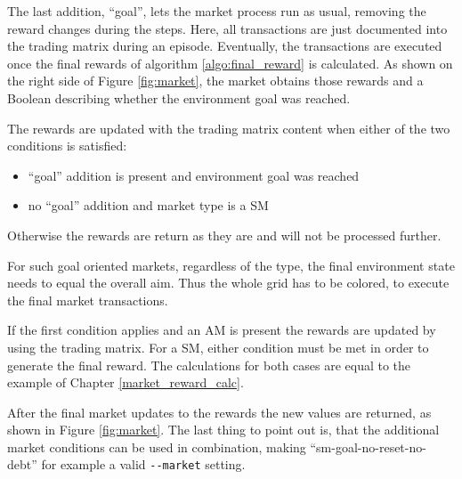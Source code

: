 The last addition, ``goal'', lets the market process run as usual, removing the reward changes during the steps. Here, all transactions are just documented into the trading matrix during an episode. Eventually, the transactions are executed once the final rewards of algorithm \ref{algo:final_reward} is calculated. As shown on the right side of Figure \ref{fig:market}, the market obtains those rewards and a Boolean describing whether the environment goal was reached.

The rewards are updated with the trading matrix content when either of the two conditions is satisfied:
\begin{itemize}
    \item ``goal'' addition is present and environment goal was reached
    \item no ``goal'' addition and market type is a SM
\end{itemize}
Otherwise the rewards are return as they are and will not be processed further. 

For such goal oriented markets, regardless of the type, the final environment state needs to equal the overall aim. Thus the whole grid has to be colored, to execute the final market transactions.


If the first condition applies and an AM is present the rewards are updated by using the trading matrix. For a SM, either condition must be met in order to generate the final reward. The calculations for both cases are equal to the example of Chapter \ref{market_reward_calc}.

After the final market updates to the rewards the new values are returned, as shown in Figure \ref{fig:market}. The last thing to point out is, that the additional market conditions can be used in combination, making ``sm-goal-no-reset-no-debt'' for example a valid \verb|--market| setting.